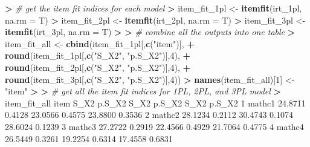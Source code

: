 \documentclass[
]{article}
\newenvironment{Shaded}{\begin{snugshade}}{\end{snugshade}}
\newcommand{\AttributeTok}[1]{\textcolor[rgb]{0.13,0.29,0.53}{#1}}
\newcommand{\CommentTok}[1]{\textcolor[rgb]{0.56,0.35,0.01}{\textit{#1}}}
\newcommand{\DecValTok}[1]{\textcolor[rgb]{0.00,0.00,0.81}{#1}}
\newcommand{\ErrorTok}[1]{\textcolor[rgb]{0.64,0.00,0.00}{\textbf{#1}}}
\newcommand{\FloatTok}[1]{\textcolor[rgb]{0.00,0.00,0.81}{#1}}
\newcommand{\FunctionTok}[1]{\textcolor[rgb]{0.13,0.29,0.53}{\textbf{#1}}}
\newcommand{\NormalTok}[1]{#1}
\newcommand{\OtherTok}[1]{\textcolor[rgb]{0.56,0.35,0.01}{#1}}
\newcommand{\SpecialCharTok}[1]{\textcolor[rgb]{0.81,0.36,0.00}{\textbf{#1}}}
\newcommand{\StringTok}[1]{\textcolor[rgb]{0.31,0.60,0.02}{#1}}
\begin{document}
\begin{Shaded}
\begin{Highlighting}[]
\SpecialCharTok{\textgreater{}} \CommentTok{\# get the item fit indices for each model}
\ErrorTok{\textgreater{}}\NormalTok{ item\_fit\_1pl }\OtherTok{\textless{}{-}} \FunctionTok{itemfit}\NormalTok{(irt\_1pl, }\AttributeTok{na.rm =}\NormalTok{ T)}
\SpecialCharTok{\textgreater{}}\NormalTok{ item\_fit\_2pl }\OtherTok{\textless{}{-}} \FunctionTok{itemfit}\NormalTok{(irt\_2pl, }\AttributeTok{na.rm =}\NormalTok{ T)}
\SpecialCharTok{\textgreater{}}\NormalTok{ item\_fit\_3pl }\OtherTok{\textless{}{-}} \FunctionTok{itemfit}\NormalTok{(irt\_3pl, }\AttributeTok{na.rm =}\NormalTok{ T)}
\SpecialCharTok{\textgreater{}} 
\ErrorTok{\textgreater{}} \CommentTok{\# combine all the outputs into one table}
\ErrorTok{\textgreater{}}\NormalTok{ item\_fit\_all }\OtherTok{\textless{}{-}} \FunctionTok{cbind}\NormalTok{(item\_fit\_1pl[,}\FunctionTok{c}\NormalTok{(}\StringTok{"item"}\NormalTok{)],}
\SpecialCharTok{+}                       \FunctionTok{round}\NormalTok{(item\_fit\_1pl[,}\FunctionTok{c}\NormalTok{(}\StringTok{"S\_X2"}\NormalTok{, }\StringTok{"p.S\_X2"}\NormalTok{)],}\DecValTok{4}\NormalTok{),}
\SpecialCharTok{+}                       \FunctionTok{round}\NormalTok{(item\_fit\_2pl[,}\FunctionTok{c}\NormalTok{(}\StringTok{"S\_X2"}\NormalTok{, }\StringTok{"p.S\_X2"}\NormalTok{)],}\DecValTok{4}\NormalTok{),}
\SpecialCharTok{+}                       \FunctionTok{round}\NormalTok{(item\_fit\_3pl[,}\FunctionTok{c}\NormalTok{(}\StringTok{"S\_X2"}\NormalTok{, }\StringTok{"p.S\_X2"}\NormalTok{)],}\DecValTok{4}\NormalTok{))}
\SpecialCharTok{\textgreater{}} \FunctionTok{names}\NormalTok{(item\_fit\_all)[}\DecValTok{1}\NormalTok{] }\OtherTok{\textless{}{-}} \StringTok{"item"}
\SpecialCharTok{\textgreater{}} 
\ErrorTok{\textgreater{}} \CommentTok{\# get all the item fit indices for 1PL, 2PL, and 3PL model}
\ErrorTok{\textgreater{}}\NormalTok{ item\_fit\_all}
\NormalTok{      item     S\_X2 p.S\_X2    S\_X2 p.S\_X2    S\_X2 p.S\_X2}
\DecValTok{1}\NormalTok{   mathc1  }\FloatTok{24.8711} \FloatTok{0.4128} \FloatTok{23.0566} \FloatTok{0.4575} \FloatTok{23.8800} \FloatTok{0.3536}
\DecValTok{2}\NormalTok{   mathc2  }\FloatTok{28.1234} \FloatTok{0.2112} \FloatTok{30.4743} \FloatTok{0.1074} \FloatTok{28.6024} \FloatTok{0.1239}
\DecValTok{3}\NormalTok{   mathc3  }\FloatTok{27.2722} \FloatTok{0.2919} \FloatTok{22.4566} \FloatTok{0.4929} \FloatTok{21.7064} \FloatTok{0.4775}
\DecValTok{4}\NormalTok{   mathc4  }\FloatTok{26.5449} \FloatTok{0.3261} \FloatTok{19.2254} \FloatTok{0.6314} \FloatTok{17.4558} \FloatTok{0.6831}

\end{Highlighting}
\end{Shaded}
\end{document}
